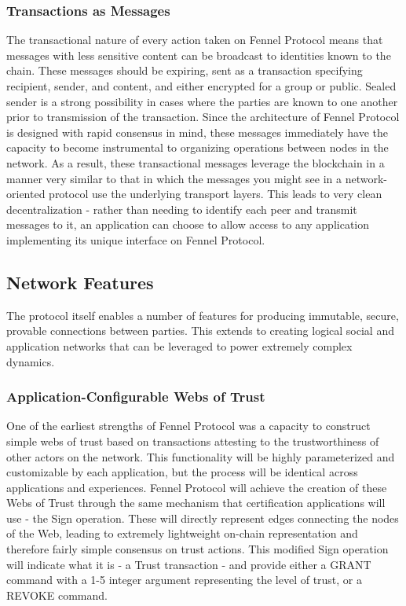 \documentclass[]{article}
\begin{document}
\subsubsection{Transactions as Messages}
\label{scrivauto:16}

The transactional nature of every action taken on Fennel Protocol means that messages with less sensitive content can be broadcast to identities known to the chain. These messages should be expiring, sent as a transaction specifying recipient, sender, and content, and either encrypted for a group or public. Sealed sender is a strong possibility in cases where the parties are known to one another prior to transmission of the transaction. Since the architecture of Fennel Protocol is designed with rapid consensus in mind, these messages immediately have the capacity to become instrumental to organizing operations between nodes in the network. As a result, these transactional messages leverage the blockchain in a manner very similar to that in which the messages you might see in a network-oriented protocol use the underlying transport layers. This leads to very clean decentralization - rather than needing to identify each peer and transmit messages to it, an application can choose to allow access to any application implementing its unique interface on Fennel Protocol.

\subsection{Network Features}
\label{scrivauto:17}

The protocol itself enables a number of features for producing immutable, secure, provable connections between parties. This extends to creating logical social and application networks that can be leveraged to power extremely complex dynamics.

\subsubsection{Application-Configurable Webs of Trust}
\label{scrivauto:18}

One of the earliest strengths of Fennel Protocol was a capacity to construct simple webs of trust based on transactions attesting to the trustworthiness of other actors on the network. This functionality will be highly parameterized and customizable by each application, but the process will be identical across applications and experiences.
Fennel Protocol will achieve the creation of these Webs of Trust through the same mechanism that certification applications will use - the Sign operation. These will directly represent edges connecting the nodes of the Web, leading to extremely lightweight on-chain representation and therefore fairly simple consensus on trust actions. This modified Sign operation will indicate what it is - a Trust transaction - and provide either a GRANT command with a 1-5 integer argument representing the level of trust, or a REVOKE command.
\end{document}
